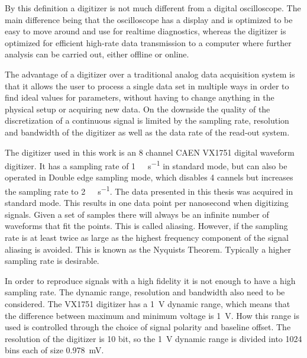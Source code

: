 \documentclass[main.tex]{subfiles}
\begin{document}
By this definition a digitizer is not much different from a digital oscilloscope. The main difference being that the oscilloscope has a display and is optimized to be easy to move around and use for realtime diagnostics, whereas the digitizer is optimized for efficient high-rate data transmission to a computer where further analysis can be carried out, either offline or online.

The advantage of a digitizer over a traditional analog data acquisition system is that it allows the user to process a single data set in multiple ways in order to find ideal values for parameters, without having to change anything in the physical setup or acquiring new data. On the downside the quality of the discretization of a continuous signal is limited by the sampling rate, resolution and bandwidth of the digitizer as well as the data rate of the read-out system.

The digitizer used in this work is an 8 channel CAEN VX1751 digital waveform digitizer. It has a sampling rate of \si{1\giga\sample\per\second} in standard mode, but can also be operated in Double edge sampling mode, which disables 4 cannels but increases the sampling rate to \si{2\giga\sample\per\second}\cite[p.9]{CAEN}. The data presented in this thesis was acquired in standard mode. This results in one data point per nanosecond when digitizing signals. Given a set of samples there will always be an infinite number of waveforms that fit the points\cite{Spectrum}. This is called aliasing. However, if the sampling rate is at least twice as large as the highest frequency component of the signal aliasing is avoided. This is known as the Nyquists Theorem. Typically a higher sampling rate is desirable.

In order to reproduce signals with a high fidelity it is not enough to have a high sampling rate. The dynamic range, resolution and bandwidth also need to be considered. The VX1751 digitizer has a \SI{1}{\volt} dynamic range, which means that the difference between maximum and minimum voltage is \SI{1}{\volt}. How this range is used is controlled through the choice of signal polarity and baseline offset. The resolution of the digitizer is 10 bit, so the \si{1\volt} dynamic range is divided into 1024 bins each of size \SI{0.978}{\milli\volt}\cite{CAEN}. 
\end{document}
